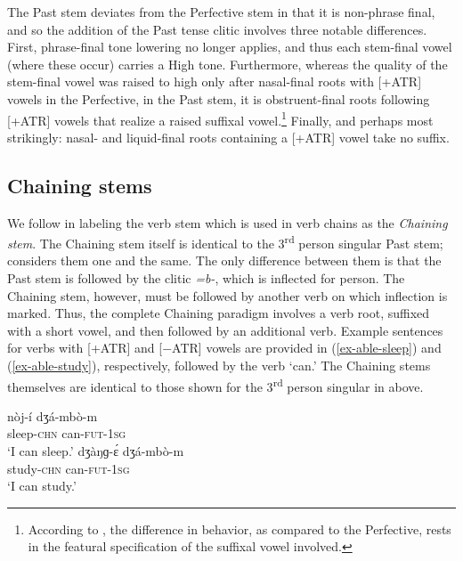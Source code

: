 \documentclass[output=paper,colorlinks,citecolor=brown]{langscibook}
\begin{document}
The Past stem deviates from the Perfective stem in that it is non-phrase final, and so the addition of the Past tense clitic involves three notable differences. First, phrase-final tone lowering no longer applies, and thus each stem-final vowel (where these occur) carries a High tone. Furthermore, whereas the quality of the stem-final vowel was raised to high only after nasal-final roots with [+ATR] vowels in the Perfective, in the Past stem, it is obstruent-final roots following [+ATR] vowels that realize a raised suffixal vowel.\footnote{According to \citet{GreenHantgan}, the difference in behavior, as compared to the Perfective, rests in the featural specification of the suffixal vowel involved.} Finally, and perhaps most strikingly: nasal- and liquid-final roots containing a [+ATR] vowel take no suffix.

\subsection{Chaining stems}
\label{subsec-chn}

We follow \citet{HeathBS2017} in labeling the verb stem which is used in verb chains as the \textit{Chaining stem}. The Chaining stem itself is identical to the 3\textsuperscript{rd} person singular Past stem; \citet[220]{HeathBS2017} considers them one and the same. The only difference between them is that the Past stem is followed by the  clitic \textit{=b-}, which is inflected for person. The Chaining stem, however, must be followed by another verb on which inflection is marked. Thus, the complete Chaining paradigm involves a verb root, suffixed with a short vowel, and then followed by an additional verb. Example sentences for verbs with [+ATR] and [−ATR] vowels are provided in (\ref{ex-able-sleep}) and (\ref{ex-able-study}), respectively, followed by the verb `can.' The Chaining stems themselves are identical to those shown for the 3\textsuperscript{rd} person singular in  above.

\begin{multicols}{2}
\ea \label{ex-able-sleep}
\gll nòj-í                           dʒá-mbò-m\\
     sleep-\textsc{chn} can-\textsc{fut}-\textsc{1sg}\\
\glt `I can sleep.'
\z
\ea \label{ex-able-study}
\gll dʒàŋɡ-ɛ́                           dʒá-mbò-m\\
     study-\textsc{chn} can-\textsc{fut}-\textsc{1sg}\\
\glt `I can study.'
\z
\end{multicols}
\end{document}
